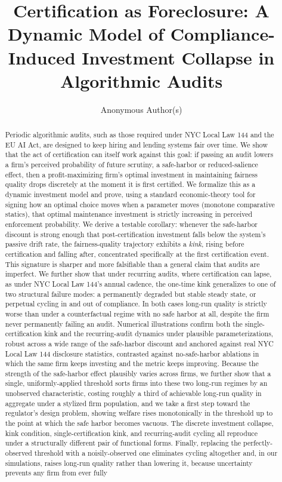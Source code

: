 \documentclass[manuscript,screen,review,anonymous]{acmart}
\theoremstyle{compact}
\begin{document}
\title{Certification as Foreclosure: A Dynamic Model of Compliance-Induced Investment Collapse in Algorithmic Audits}

\author{Anonymous Author(s)}

\begin{abstract}
Periodic algorithmic audits, such as those required under NYC Local Law 144 and the EU AI Act, are designed to keep hiring and lending systems fair over time. We show that the act of certification can itself work against this goal: if passing an audit lowers a firm's perceived probability of future scrutiny, a safe-harbor or reduced-salience effect, then a profit-maximizing firm's optimal investment in maintaining fairness quality drops discretely at the moment it is first certified. We formalize this as a dynamic investment model and prove, using a standard economic-theory tool for signing how an optimal choice moves when a parameter moves (monotone comparative statics), that optimal maintenance investment is strictly increasing in perceived enforcement probability. We derive a testable corollary: whenever the safe-harbor discount is strong enough that post-certification investment falls below the system's passive drift rate, the fairness-quality trajectory exhibits a \emph{kink}, rising before certification and falling after, concentrated specifically at the first certification event. This signature is sharper and more falsifiable than a general claim that audits are imperfect. We further show that under recurring audits, where certification can lapse, as under NYC Local Law 144's annual cadence, the one-time kink generalizes to one of two structural failure modes: a permanently degraded but stable steady state, or perpetual cycling in and out of compliance. In both cases long-run quality is strictly worse than under a counterfactual regime with no safe harbor at all, despite the firm never permanently failing an audit. Numerical illustrations confirm both the single-certification kink and the recurring-audit dynamics under plausible parameterizations, robust across a wide range of the safe-harbor discount and anchored against real NYC Local Law 144 disclosure statistics, contrasted against no-safe-harbor ablations in which the same firm keeps investing and the metric keeps improving. Because the strength of the safe-harbor effect plausibly varies across firms, we further show that a single, uniformly-applied threshold sorts firms into these two long-run regimes by an unobserved characteristic, costing roughly a third of achievable long-run quality in aggregate under a stylized firm population, and we take a first step toward the regulator's design problem, showing welfare rises monotonically in the threshold up to the point at which the safe harbor becomes vacuous. The discrete investment collapse, kink condition, single-certification kink, and recurring-audit cycling all reproduce under a structurally different pair of functional forms. Finally, replacing the perfectly-observed threshold with a noisily-observed one eliminates cycling altogether and, in our simulations, raises long-run quality rather than lowering it, because uncertainty prevents any firm from ever fully 
\end{abstract}
\end{document}
